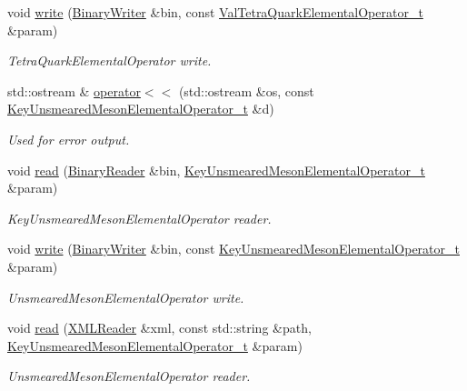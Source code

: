 \begin{DoxyCompactItemize}
void \mbox{\hyperlink{namespaceHadron_ac78ff88ef705b3eaa48d7d440fe2a299}{write}} (\mbox{\hyperlink{classADATIO_1_1BinaryWriter}{Binary\+Writer}} \&bin, const \mbox{\hyperlink{structHadron_1_1ValTetraQuarkElementalOperator__t}{Val\+Tetra\+Quark\+Elemental\+Operator\+\_\+t}} \&param)
\begin{DoxyCompactList}\small\item\em Tetra\+Quark\+Elemental\+Operator write. \end{DoxyCompactList}\item 
std\+::ostream \& \mbox{\hyperlink{namespaceHadron_ae69192d40800d30f5ef75a6d3ce3ae6e}{operator$<$$<$}} (std\+::ostream \&os, const \mbox{\hyperlink{structHadron_1_1KeyUnsmearedMesonElementalOperator__t}{Key\+Unsmeared\+Meson\+Elemental\+Operator\+\_\+t}} \&d)
\begin{DoxyCompactList}\small\item\em Used for error output. \end{DoxyCompactList}\item 
void \mbox{\hyperlink{namespaceHadron_a1a172c91f55bd8989d9751c7f8b5ac28}{read}} (\mbox{\hyperlink{classADATIO_1_1BinaryReader}{Binary\+Reader}} \&bin, \mbox{\hyperlink{structHadron_1_1KeyUnsmearedMesonElementalOperator__t}{Key\+Unsmeared\+Meson\+Elemental\+Operator\+\_\+t}} \&param)
\begin{DoxyCompactList}\small\item\em Key\+Unsmeared\+Meson\+Elemental\+Operator reader. \end{DoxyCompactList}\item 
void \mbox{\hyperlink{namespaceHadron_ac88cbe3678a2276ee3dd2d55fff0cabf}{write}} (\mbox{\hyperlink{classADATIO_1_1BinaryWriter}{Binary\+Writer}} \&bin, const \mbox{\hyperlink{structHadron_1_1KeyUnsmearedMesonElementalOperator__t}{Key\+Unsmeared\+Meson\+Elemental\+Operator\+\_\+t}} \&param)
\begin{DoxyCompactList}\small\item\em Unsmeared\+Meson\+Elemental\+Operator write. \end{DoxyCompactList}\item 
void \mbox{\hyperlink{namespaceHadron_aa1de9a72a85fa51b9a685a0a2d674b7c}{read}} (\mbox{\hyperlink{classADATXML_1_1XMLReader}{X\+M\+L\+Reader}} \&xml, const std\+::string \&path, \mbox{\hyperlink{structHadron_1_1KeyUnsmearedMesonElementalOperator__t}{Key\+Unsmeared\+Meson\+Elemental\+Operator\+\_\+t}} \&param)
\begin{DoxyCompactList}\small\item\em Unsmeared\+Meson\+Elemental\+Operator reader. \end{DoxyCompactList}\item 

\end{DoxyCompactItemize}
